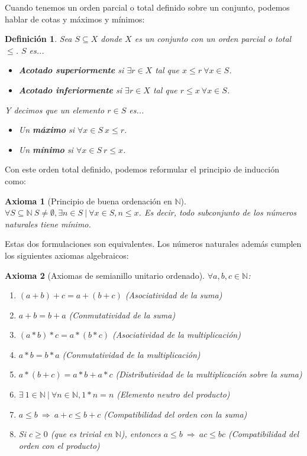 \documentclass{article}
\newtheorem{axiom}{Axioma}
\newtheorem{define}{Definición}
\begin{document}
Cuando tenemos un orden parcial o total definido sobre un conjunto, podemos hablar de cotas y máximos y mínimos:
\begin{define}
Sea $S \subseteq X$ donde $X$ es un conjunto con un orden parcial o total $\leq$. $S$ es...
\begin{itemize}
\item
\textbf{Acotado superiormente} si $\exists r \in X$ tal que $x \leq r\ \forall x \in S$.
\item
\textbf{Acotado inferiormente} si $\exists r \in X$ tal que $r \leq x\ \forall x \in S$.
\end{itemize}
Y decimos que un elemento $r \in S$ es...
\begin{itemize}
\item
Un \textbf{máximo} si $\forall x \in S\ x\leq r$.
\item
Un \textbf{mínimo} si $\forall x \in S\ r\leq x$.
\end{itemize}
\end{define}


Con este orden total definido, podemos reformular el principio de inducción como:

\begin{axiom}[Principio de buena ordenación en $\mathbb{N}$]
\label{ax_wellordering}
$\forall S \subseteq \mathbb{N}\ S\neq \emptyset,\exists n \in S\ |\ \forall x \in S, n\leq x$. Es decir, todo subconjunto de los números naturales tiene mínimo.
\end{axiom}

Estas dos formulaciones son equivalentes.
Los números naturales además cumplen los siguientes axiomas algebraicos:

\begin{axiom}[Axiomas de semianillo unitario ordenado]
\label{ax_usemiring}
$\forall a,b,c \in \mathbb{N}$:
\begin{enumerate}
	\item
	$(a+b)+c=a+(b+c)$ (Asociatividad de la suma)
	\item
	$a+b=b+a$ (Conmutatividad de la suma)
	\item
	$(a*b)*c=a*(b*c)$ (Asociatividad de la multiplicación)
	\item
	$a*b=b*a$ (Conmutatividad de la multiplicación)
	\item
	$a*(b+c) = a*b + a*c$ (Distributividad de la multiplicación sobre la suma)
	\item
	$\exists\ 1 \in \mathbb{N}\ |\ \forall n \in \mathbb{N},1*n = n$ (Elemento neutro del producto)
	\item
	$a \leq b \ \Rightarrow \ a+c\leq b+c$ (Compatibilidad del orden con la suma)
	\item
	Si $c\geq 0 $ (que es trivial en $\mathbb{N}$), entonces $a \leq b\ \Rightarrow \ ac \leq bc $ (Compatibilidad del orden con el producto)
\end{enumerate}
\end{axiom}
\end{document}
